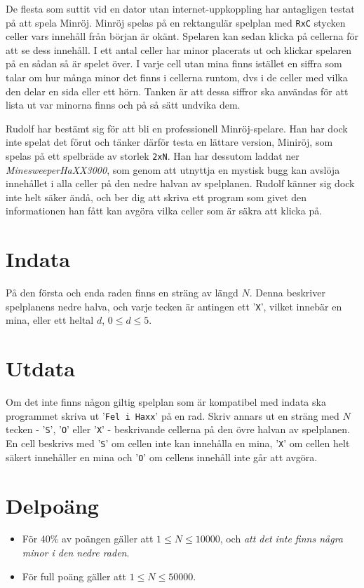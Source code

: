 De flesta som suttit vid en dator utan internet-uppkoppling har antagligen testat på att spela Minröj. Minröj spelas på en rektangulär spelplan med \texttt{RxC} stycken celler vars innehåll från början är okänt. Spelaren kan sedan klicka på cellerna för att se dess innehåll. I ett antal celler har minor placerats ut och klickar spelaren på en sådan så är spelet över. I varje cell utan mina finns istället en siffra som talar om hur många minor det finns i cellerna runtom, dvs i de celler med vilka den delar en sida eller ett hörn. Tanken är att dessa siffror ska användas för att lista ut var minorna finns och på så sätt undvika dem.

Rudolf har bestämt sig för att bli en professionell Minröj-spelare. Han har dock inte spelat det förut och tänker därför testa en lättare version, Miniröj, som spelas på ett spelbräde av storlek \texttt{2xN}. Han har dessutom laddat ner \emph{MinesweeperHaXX3000}, som genom att utnyttja en mystisk bugg kan avslöja innehållet i alla celler på den nedre halvan av spelplanen. Rudolf känner sig dock inte helt säker ändå, och ber dig att skriva ett program som givet den informationen han fått kan avgöra vilka celler som är säkra att klicka på.

\section*{Indata}
På den första och enda raden finns en sträng av längd $N$. Denna beskriver spelplanens nedre halva, och varje tecken är antingen ett '\texttt{X}', vilket innebär en mina, eller ett heltal $d$, $0 \leq d \leq 5$.

\section*{Utdata}
Om det inte finns någon giltig spelplan som är kompatibel med indata ska programmet skriva ut '\texttt{Fel i Haxx}' på en rad. Skriv annars ut en sträng med $N$ tecken - '\texttt{S}', '\texttt{O}' eller '\texttt{X}' - beskrivande cellerna på den övre halvan av spelplanen. En cell beskrivs med '\texttt{S}' om cellen inte kan innehålla en mina, '\texttt{X}' om cellen helt säkert innehåller en mina och '\texttt{O}' om cellens innehåll inte går att avgöra.

\section*{Delpoäng}
\begin{itemize}
\item För 40\% av poängen gäller att $1 \leq N \leq 10 000$, och \emph{att det inte finns några minor i den nedre raden}.
\item För full poäng gäller att $1 \leq N \leq 50 000$.
\end{itemize}

